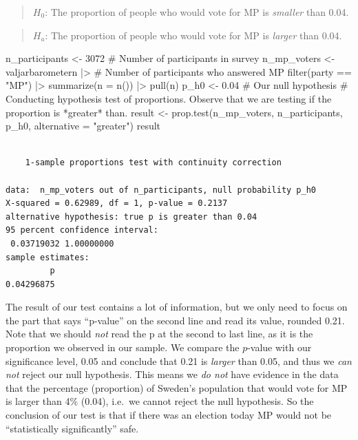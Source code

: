 \documentclass[
  letterpaper,
  DIV=11,
  numbers=noendperiod]{scrreprt}
\newenvironment{Shaded}{\begin{snugshade}}{\end{snugshade}}
\newcommand{\AttributeTok}[1]{\textcolor[rgb]{0.40,0.45,0.13}{#1}}
\newcommand{\CommentTok}[1]{\textcolor[rgb]{0.37,0.37,0.37}{#1}}
\newcommand{\DecValTok}[1]{\textcolor[rgb]{0.68,0.00,0.00}{#1}}
\newcommand{\FloatTok}[1]{\textcolor[rgb]{0.68,0.00,0.00}{#1}}
\newcommand{\FunctionTok}[1]{\textcolor[rgb]{0.28,0.35,0.67}{#1}}
\newcommand{\NormalTok}[1]{\textcolor[rgb]{0.00,0.23,0.31}{#1}}
\newcommand{\OtherTok}[1]{\textcolor[rgb]{0.00,0.23,0.31}{#1}}
\newcommand{\SpecialCharTok}[1]{\textcolor[rgb]{0.37,0.37,0.37}{#1}}
\newcommand{\StringTok}[1]{\textcolor[rgb]{0.13,0.47,0.30}{#1}}
\begin{document}
\begin{quote}
\textbf{\(H_0\)}: The proportion of people who would vote for MP is
\emph{smaller} than 0.04.
\end{quote}

\begin{quote}
\textbf{\(H_a\)}: The proportion of people who would vote for MP is
\emph{larger} than 0.04.
\end{quote}

\begin{Shaded}
\begin{Highlighting}[]
\NormalTok{n\_participants }\OtherTok{\textless{}{-}} \DecValTok{3072} \CommentTok{\# Number of participants in survey}
\NormalTok{n\_mp\_voters }\OtherTok{\textless{}{-}}\NormalTok{ valjarbarometern }\SpecialCharTok{|\textgreater{}} \CommentTok{\# Number of participants who answered MP}
  \FunctionTok{filter}\NormalTok{(party }\SpecialCharTok{==} \StringTok{"MP"}\NormalTok{) }\SpecialCharTok{|\textgreater{}}
  \FunctionTok{summarize}\NormalTok{(}\AttributeTok{n =} \FunctionTok{n}\NormalTok{()) }\SpecialCharTok{|\textgreater{}}
  \FunctionTok{pull}\NormalTok{(n)}
\NormalTok{p\_h0 }\OtherTok{\textless{}{-}} \FloatTok{0.04} \CommentTok{\# Our null hypothesis}
\CommentTok{\# Conducting hypothesis test of proportions. Observe that we are testing if the proportion is *greater* than.}
\NormalTok{result }\OtherTok{\textless{}{-}} \FunctionTok{prop.test}\NormalTok{(n\_mp\_voters, n\_participants, p\_h0, }\AttributeTok{alternative =} \StringTok{"greater"}\NormalTok{)}
\NormalTok{result}
\end{Highlighting}
\end{Shaded}

\begin{verbatim}

    1-sample proportions test with continuity correction

data:  n_mp_voters out of n_participants, null probability p_h0
X-squared = 0.62989, df = 1, p-value = 0.2137
alternative hypothesis: true p is greater than 0.04
95 percent confidence interval:
 0.03719032 1.00000000
sample estimates:
         p 
0.04296875 
\end{verbatim}

The result of our test contains a lot of information, but we only need
to focus on the part that says ``p-value'' on the second line and read
its value, rounded 0.21. Note that we should \emph{not} read the p at
the second to last line, as it is the proportion we observed in our
sample. We compare the \(p\)-value with our significance level, 0.05 and
conclude that 0.21 is \emph{larger} than 0.05, and thus we \emph{can
not} reject our null hypothesis. This means we \emph{do not} have
evidence in the data that the percentage (proportion) of Sweden's
population that would vote for MP is larger than 4\% (0.04), i.e.~we
cannot reject the null hypothesis. So the conclusion of our test is that
if there was an election today MP would not be ``statistically
significantly'' safe.
\end{document}
